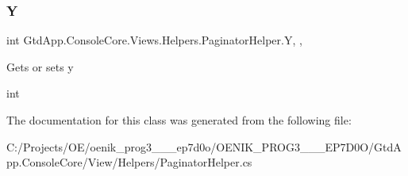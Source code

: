 \subsubsection{\texorpdfstring{Y}{Y}}
{\footnotesize\ttfamily int Gtd\+App.\+Console\+Core.\+Views.\+Helpers.\+Paginator\+Helper.\+Y\hspace{0.3cm}{\ttfamily [get]}, {\ttfamily [set]}, {\ttfamily [private]}}



Gets or sets y 

int

The documentation for this class was generated from the following file\+:\begin{DoxyCompactItemize}
\item 
C\+:/\+Projects/\+O\+E/oenik\+\_\+prog3\+\_\+\_\+\_\+ep7d0o/\+O\+E\+N\+I\+K\+\_\+\+P\+R\+O\+G3\+\_\+\_\+\_\+\+E\+P7\+D0\+O/\+Gtd\+App.\+Console\+Core/\+View/\+Helpers/Paginator\+Helper.\+cs\end{DoxyCompactItemize}
